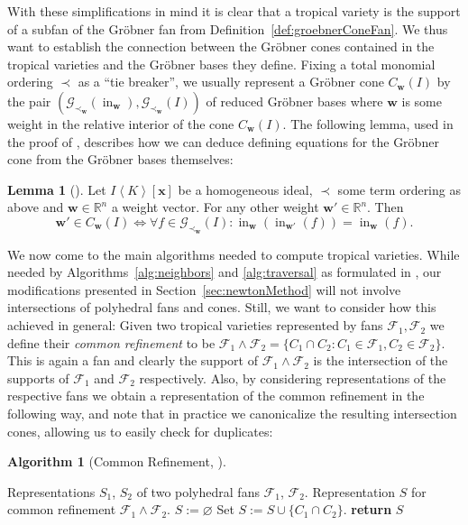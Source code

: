 \documentclass[
  paper=a4,
  titlepage,
  bibliography=totoc,
  listof=totoc,
  pagesize=pdftex
]{scrartcl}
\numberwithin{figure}{section}
\numberwithin{equation}{section}
\numberwithin{table}{section}
\newcommand*\setR{\mathds{R}}
\newcommand*\ideal[1]{\left\langle #1 \right\rangle}
\let\vec\mathbf
\DeclareMathOperator{\initial}{in}
\theoremstyle{definition}
\newtheorem{lemma}[definition]{Lemma}
\newtheorem{algo}[definition]{Algorithm}
\numberwithin{definition}{section}
\begin{document}
With these simplifications in mind it is clear that a tropical variety is the support of a
subfan of the Gröbner fan from Definition~\ref{def:groebnerConeFan}. We thus want to
establish the connection between the Gröbner cones contained in the tropical varieties and
the Gröbner bases they define. Fixing a total monomial ordering $\prec$ as a \enquote{tie
breaker}, we usually represent a Gröbner cone $C_{\vec w}(I)$ by the pair $(\mathcal
G_{\prec_{\vec w}}(\initial_{\vec w}), \mathcal G_{\prec_{\vec w}}(I))$ of reduced Gröbner
bases where $\vec w$ is some weight in the relative interior of the cone $C_{\vec w}(I)$.
The following lemma, used in the proof of \cite[Proposition~2.3]{SturmGBCP}, describes how
we can deduce defining equations for the Gröbner cone from the Gröbner bases themselves:

\begin{lemma}[{\cite[Lemma~4.2]{compTropVar}}]
  \label{lem:grConEq}
  Let $I \ideal K[\vec x]$ be a homogeneous ideal, $\prec$ some term ordering as above and
  $\vec w \in \setR^n$ a weight vector. For any other weight $\vec w' \in \setR^n$. Then
  \[
    \vec w' \in C_{\vec w}(I) \iff
    \forall f \in \mathcal G_{\prec_{\vec w}}(I) :
    \initial_{\vec w}(\initial_{\vec w'}(f)) = \initial_{\vec w}(f).
  \]
\end{lemma}

We now come to the main algorithms needed to compute tropical varieties. While needed by
Algorithms~\ref{alg:neighbors} and \ref{alg:traversal} as formulated in
\cite{compTropVar}, our modifications presented in Section~\ref{sec:newtonMethod} will not
involve intersections of polyhedral fans and cones. Still, we want to consider how this
achieved in general: Given two tropical varieties represented by fans $\mathcal F_1,
\mathcal F_2$ we define their \emph{common refinement} to be $\mathcal F_1 \wedge \mathcal
F_2 = \{ C_1 \cap C_2 : C_1 \in \mathcal F_1, C_2 \in \mathcal F_2 \}$. This is again a
fan and clearly the support of $\mathcal F_1 \wedge \mathcal F_2$ is the intersection of
the supports of $\mathcal F_1$ and $\mathcal F_2$ respectively. Also, by considering
representations of the respective fans we obtain a representation of the common refinement
in the following way, and note that in practice we canonicalize the resulting intersection
cones, allowing us to easily check for duplicates:

\begin{algo}[Common Refinement, {\cite[Algorithm~4.4]{compTropVar}}]\
  \label{alg:fanRefinement}
  \begin{algorithmic}[1]
    \Require Representations $S_1$, $S_2$ of two polyhedral fans $\mathcal
      F_1$, $\mathcal F_2$.
    \Ensure Representation $S$ for common refinement $\mathcal F_1 \wedge \mathcal F_2$.
    \State $S := \varnothing$
      \State Set $S := S \cup \{ C_1 \cap C_2 \}$.
    \EndFor
    \State\textbf{return} $S$
  \end{algorithmic}
\end{algo}
\end{document}
